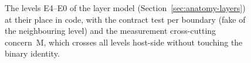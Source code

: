 \begin{nurlang}
\begin{figure}[htbp]
\caption[The levels E4--E0 in code]{The levels E4--E0 of the layer model (Section~\ref{sec:anatomy-layers}) at their place in code,
with the contract test per boundary (fake of the neighbouring level) and the measurement cross-cutting
concern~M, which crosses all levels host-side without touching the binary identity.}\label{fig:impl-layers}
\end{figure}


\end{nurlang}
